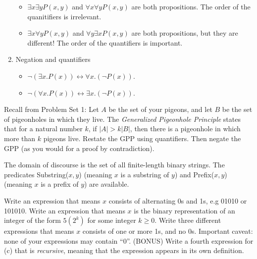 \documentclass[solution, letterpaper]{cs20inclass}
\begin{document}
\begin{enumerate}
\begin{itemize}
\item $\exists x \exists y P(x,y)$ and $\forall x \forall y P(x,y)$ are both propositions. The order of the quanitifiers is irrelevant.

\item $\exists x \forall y P(x,y)$ and $\forall y \exists x P(x,y)$ are both propositions, but they are different! The order of the quantifiers is important. 

\end{itemize}

\item Negation and quantifiers
\begin{itemize}
\item $\neg (\exists x. P(x)) \leftrightarrow \forall x. (\neg P(x))$.
\item $\neg (\forall x. P(x)) \leftrightarrow \exists x. (\neg P(x))$.

\end{itemize}

\end{enumerate}

\problem Recall from Problem Set 1: Let $A$ be the set of your pigeons, and let $B$ be the set of pigeonholes in which they live. The \textit{Generalized Pigeonhole Principle} states that for a natural number $k$, if $|A| > k|B|$, then there is a pigeonhole in which more than $k$ pigeons live. Restate the GPP using quantifiers. Then negate the GPP (as you would for a proof by contradiction).

\begin{solution}
\end{solution}

\problem
 The domain of discourse is the set of all finite-length binary strings. The predicates Substring($x,y$) (meaning $x$ is a substring of $y$) and Prefix($x,y$) (meaning $x$ is a prefix of $y$) are available.

\subproblem  Write an expression that means $x$ consists of alternating 0s and 1s, e.g 01010 or 101010.
\subproblem  Write an expression that means $x$ is the binary representation of an integer of the form $5(2^k)$ for some integer $k \geq 0$.
\subproblem Write three different expressions that means $x$ consists of one or more 1s, and no 0s. Important caveat: none of your expressions may contain ``0''.
\subproblem (BONUS) Write a fourth expression for (c) that is \textit{recursive}, meaning that the expression appears in its own definition.

\begin{solution}
\end{solution}
\end{document}
